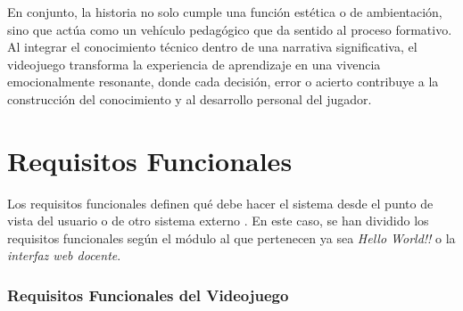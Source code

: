 En conjunto, la historia no solo cumple una función estética o de ambientación, sino que actúa como un vehículo pedagógico que da sentido al proceso formativo. Al integrar el conocimiento técnico dentro de una narrativa significativa, el videojuego transforma la experiencia de aprendizaje en una vivencia emocionalmente resonante, donde cada decisión, error o acierto contribuye a la construcción del conocimiento y al desarrollo personal del jugador.


\section{Requisitos Funcionales}

Los requisitos funcionales definen qué debe hacer el sistema desde el punto de vista del usuario o de otro sistema externo \cite{sommerville_software_2011,pressman_ingenierisoftware_2013}. En este caso, se han dividido los requisitos funcionales según el módulo al que pertenecen ya sea \textit{Hello World!!} o la \textit{interfaz web docente}.

\subsubsection*{Requisitos Funcionales del Videojuego}

